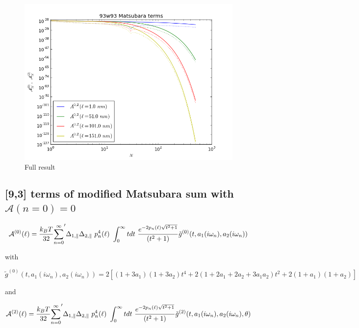 \documentclass[a4paper]{article}
\begin{document}
\begin{center}
\begin{figure}[t!]
\begin{center}
\includegraphics[width=1.0\textwidth]{plots/93_A_vs_n.png}
\hskip 43pt
\caption{Full result}
\label{eiz65}
\end{center}
\end{figure} 

\subsection{[9,3] terms of modified Matsubara sum with $\mathcal{A}(n=0)=0$}
\begin{equation}
{\cal A}^{(0)}(\ell) = \frac{k_BT}{32}  {\sum_{n=0}^{\infty}}' \Delta_{1,\parallel} \Delta_{2,\parallel} ~p_n^{4}(\ell) ~\int_0^{\infty} t dt ~\frac{e^{- 2 p_n(\ell) \sqrt{t^{2} + 1}}}{(t^{2} + 1)} \tilde g^{(0)}(t, a_1(i \omega_n), a_2(i \omega_n))
\end{equation}

with

\begin{equation}
\tilde g^{(0)}(t, a_1(i \omega_n), a_2(i \omega_n)) = 2 \left[ (1+3a_1)(1+3a_2) t^{4} + 2 (1+2a_1+2a_2+3a_1a_2) t^{2}  + 2(1+a_1)(1+a_2)\right]
\end{equation}

and

\begin{equation}
{\cal A}^{(2)}(\ell) = \frac{k_BT}{32}  {\sum_{n=0}^{\infty}}' \Delta_{1,\parallel} \Delta_{2,\parallel} ~p_n^{4}(\ell) ~\int_0^{\infty} t dt ~\frac{e^{- 2 p_n(\ell) \sqrt{t^{2} + 1}}}{(t^{2} + 1)} \tilde g^{(2)}(t, a_1(i \omega_n), a_2(i \omega_n), \theta)
\end{equation}


\end{center}
\end{document}
